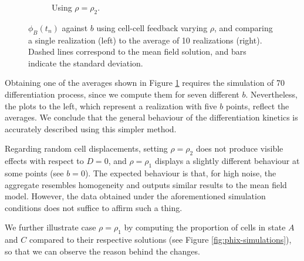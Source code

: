 \begin{figure}[p]
\begin{subfigure}{\textwidth}
\begin{subfigure}{0.47\textwidth}
        \end{subfigure}
        \caption{Using $\rho=\rho_2$.}
    \end{subfigure}
    \caption{$\phi_B(t_n)$ against $b$ using cell-cell feedback varying $\rho$, and comparing a single realization (left) to the average of 10 realizations (right). Dashed lines correspond to the mean field solution, and bars indicate the standard deviation.}
    \label{fig:phib-simulations}
\end{figure}

Obtaining one of the averages shown in Figure \ref{fig:phib-simulations} requires the simulation of 70 differentiation process, since we compute them for seven different $b$. Nevertheless, the plots to the left, which represent a realization with five $b$ points, reflect the averages. We conclude that the general behaviour of the differentiation kinetics is accurately described using this simpler method.

Regarding random cell displacements, setting $\rho=\rho_2$ does not produce visible effects with respect to $D = 0$, and $\rho=\rho_1$ displays a slightly different behaviour at some points (see $b=0$). The expected behaviour is that, for high noise, the aggregate resembles homogeneity and outputs similar results to the mean field model. However, the data obtained under the aforementioned simulation conditions does not suffice to affirm such a thing.

We further illustrate case $\rho=\rho_1$ by computing the proportion of cells in state $A$ and $C$ compared to their respective solutions (see Figure \ref{fig:phix-simulations}), so that we can observe the reason behind the changes.

